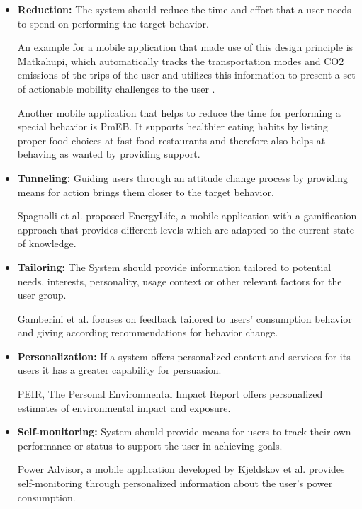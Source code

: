\begin{itemize}
	\item \textbf{Reduction:}
	The system should reduce the time and effort that a user needs to spend on performing the target behavior.
	
	An example for a mobile application that made use of this design principle is Matkahupi, which automatically tracks the transportation modes and CO2 emissions of the trips of the user and utilizes this information to present a set of actionable mobility challenges to the user \cite{jylha2013matkahupi}.
	
	Another mobile application that helps to reduce the time for performing a special behavior is PmEB. It supports healthier eating habits by listing proper food choices at fast food restaurants \cite{lee2006pmeb} and therefore also helps at behaving as wanted by providing support.
		
	\item \textbf{Tunneling:}
	Guiding users through an attitude change process by providing means for action brings them closer to the target behavior.
	
	Spagnolli et al. \cite{spagnolli2011eco} proposed EnergyLife, a mobile application with a gamification approach that provides different levels which are adapted to the current state of knowledge.
	
	\item \textbf{Tailoring:}
	The System should provide information tailored to potential needs, interests, personality, usage context or other relevant factors for the user group.
	
	Gamberini et al. \cite{gamberini2012tailoring} focuses on feedback tailored to users' consumption behavior and giving according recommendations for behavior change.
	
	\item \textbf{Personalization:}	
	If a system offers personalized content and services for its users it has a greater capability for persuasion.
	
	PEIR, The Personal Environmental Impact Report \cite{mun2009peir} offers personalized estimates of environmental impact and exposure.
	\item \textbf{Self-monitoring:}
	System should provide means for users to track their own performance or status to support the user in achieving goals.
	
	Power Advisor, a mobile application developed by Kjeldskov et al. \cite{kjeldskov2012using}	provides self-monitoring through personalized information about the user’s power consumption.
	

\end{itemize}

